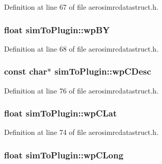 \-Definition at line 67 of file aerosimrcdatastruct.\-h.

\hypertarget{group___aero_sim_r_c_ga940744eca5513d5b45725bad868231e5}{
\subsubsection[{wp\-B\-Y}]{\setlength{\rightskip}{0pt plus 5cm}float {\bf sim\-To\-Plugin\-::wp\-B\-Y}}}\label{group___aero_sim_r_c_ga940744eca5513d5b45725bad868231e5}


\-Definition at line 68 of file aerosimrcdatastruct.\-h.

\hypertarget{group___aero_sim_r_c_gaac6ce2f906c7743fd06d88ed1e63f8d1}{
\subsubsection[{wp\-C\-Desc}]{\setlength{\rightskip}{0pt plus 5cm}const char$\ast$ {\bf sim\-To\-Plugin\-::wp\-C\-Desc}}}\label{group___aero_sim_r_c_gaac6ce2f906c7743fd06d88ed1e63f8d1}


\-Definition at line 76 of file aerosimrcdatastruct.\-h.

\hypertarget{group___aero_sim_r_c_ga478358c452d4087d066f487fab4f0fe4}{
\subsubsection[{wp\-C\-Lat}]{\setlength{\rightskip}{0pt plus 5cm}float {\bf sim\-To\-Plugin\-::wp\-C\-Lat}}}\label{group___aero_sim_r_c_ga478358c452d4087d066f487fab4f0fe4}


\-Definition at line 74 of file aerosimrcdatastruct.\-h.

\hypertarget{group___aero_sim_r_c_gafe8c244799a4b6767955285ea1ab4ed9}{
\subsubsection[{wp\-C\-Long}]{\setlength{\rightskip}{0pt plus 5cm}float {\bf sim\-To\-Plugin\-::wp\-C\-Long}}}\label{group___aero_sim_r_c_gafe8c244799a4b6767955285ea1ab4ed9}


